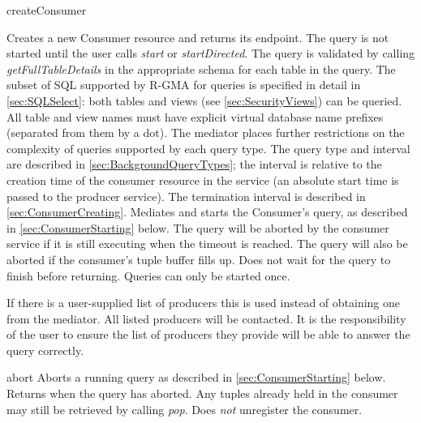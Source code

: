 \begin{method}{createConsumer}


\desc
Creates a new Consumer resource and returns its endpoint. The query is not
started until the user calls \textit{start} or \textit{startDirected}. The query
is validated by calling \textit{getFullTableDetails} in the appropriate schema
for each table in the query. The subset of SQL supported by R-GMA for queries
is specified in detail in \ref{sec:SQLSelect}: both tables and views (see
\ref{sec:SecurityViews}) can be queried. All table and view names must have
explicit virtual database name prefixes (separated from them by a dot).
The mediator places further restrictions
on the complexity of queries supported by each query type. The query type and 
interval are described in
\ref{sec:BackgroundQueryTypes}; the interval is relative to the creation time of
the consumer resource in the service (an absolute start time is passed to the
producer service). The termination interval is described in
\ref{sec:ConsumerCreating}. Mediates and starts the Consumer's query, as described in
\ref{sec:ConsumerStarting} below. The query will be aborted by the consumer
service if it is still executing when the timeout is reached. The query will
also be aborted if the consumer's tuple buffer fills up. Does not wait for
the query to finish before returning. Queries can only be started once. 

If there is a user-supplied list of producers this is used instead of obtaining 
one from the mediator. All listed producers will be contacted. It is the 
responsibility of the user to ensure the list of producers they provide will be 
able to answer the query correctly.
\end{method}

\begin{method}[consumer]{abort}			
\OK
\desc Aborts a running query as described in \ref{sec:ConsumerStarting} below.
Returns when the query has aborted. Any tuples already held in the consumer
may still be retrieved by calling \textit{pop}. Does \textit{not} unregister
the consumer.
\end{method}
				
